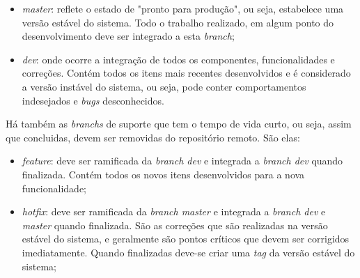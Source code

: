 \begin{itemize}
  \item \textit{master}: reflete o estado de "pronto para produção",
    ou seja, estabelece uma versão estável do sistema. Todo
    o trabalho realizado, em algum ponto do desenvolvimento
    deve ser integrado a esta \textit{branch};
  \item \textit{dev}: onde ocorre a integração de todos os componentes,
    funcionalidades e correções. Contém todos os itens mais
    recentes desenvolvidos e é considerado a versão instável
    do sistema, ou seja, pode conter comportamentos indesejados
    e \textit{bugs} desconhecidos.
\end{itemize}

Há também as \textit{branchs} de suporte que tem o tempo de vida curto, ou seja,
assim que concluidas, devem ser removidas do repositório remoto. São
elas:

\begin{itemize}
  \item \textit{feature}: deve ser ramificada da \textit{branch dev} e
    integrada a \textit{branch dev} quando finalizada. Contém todos os
    novos itens desenvolvidos para a nova funcionalidade;
  \item \textit{hotfix}: deve ser ramificada da \textit{branch master} e
    integrada a \textit{branch dev} e \textit{master} quando finalizada. São
    as correções que são realizadas na versão estável do sistema, e geralmente
    são pontos críticos que devem ser corrigidos imediatamente. Quando finalizadas
    deve-se criar uma \textit{tag} da versão estável do sistema;
\end{itemize}

